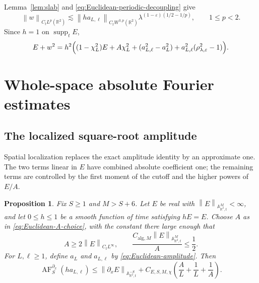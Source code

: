 \documentclass[12pt,reqno,letterpaper]{amsart}
\numberwithin{equation}{section}
\newtheorem{proposition}[theorem]{Proposition}
\theoremstyle{definition}
\newcommand{\R}{\mathbb R}
\newcommand{\A}{\mathbb A}
\newcommand{\eps}{\varepsilon}
\newcommand{\la}{\lambda}
\newcommand{\supp}{\operatorname{supp}}
\newcommand{\norm}[1]{\left\lVert #1\right\rVert}
\begin{document}
Lemma~\ref{lem:slab} and \eqref{eq:Euclidean-periodic-decoupling} give
\begin{equation}\label{eq:Euclidean-Lp}
    \norm{w}_{C_tL^p(\R^2)}
    \lesssim
    \norm{h a_{L,\ell}}_{C_tW^{3,p}(\R^2)}
    \la^{(1-\eps)(1/2-1/p)},
    \qquad 1\leq p<2.
\end{equation}
Since $h=1$ on $\supp_tE$,
\begin{equation}\label{eq:Euclidean-cancellation}
 E+w^2=h^2\Bigl((1-\chi_L^2)E+A\chi_L^2
 +(a_{L,\ell}^2-a_L^2)+a_{L,\ell}^2(\rho_{\la,\eps}^2-1)\Bigr).
\end{equation}

\section{Whole-space absolute Fourier estimates}


\subsection{The localized square-root amplitude}

Spatial localization replaces the exact amplitude identity by an
approximate one.  The two terms linear in $E$ have combined absolute
coefficient one; the remaining terms are controlled by the first moment
of the cutoff and the higher powers of $E/A$.

\begin{proposition}
\label{prop:Euclidean-amplitude-exact-coefficient}
Fix $S\geq1$ and $M>S+6$.  Let $E$ be real with
$\norm{E}_{\A^M_{\R^2,t}}<\infty$, and let $0\leq h\leq1$ be a smooth
function of time satisfying $hE=E$.  Choose $A$ as in
\eqref{eq:Euclidean-A-choice}, with the constant there large enough that
\begin{equation}\label{eq:Euclidean-amplitude-smallness}
   A\geq2\norm E_{C_tL^\infty},
   \qquad
   \frac{C_{\mathrm{alg},M}\norm E_{\A^M_{\R^2,t}}}{A}\leq\frac12.
\end{equation}
For $L,\ell\geq1$, define $a_L$ and $a_{L,\ell}$ by
\eqref{eq:Euclidean-amplitude}.  Then
\begin{equation}\label{eq:Euclidean-amplitude-exact-coefficient}
   \operatorname{AF}^{\partial_x}_S(h a_{L,\ell})
   \leq
   \norm{\partial_xE}_{\A^{-S}_{\R^2,t}}
   +C_{E,S,M,\chi}
      \left(\frac{A}{L}+\frac1L+\frac1A\right).
\end{equation}
\end{proposition}
\end{document}
